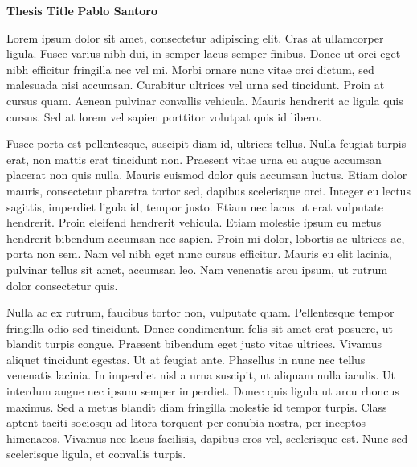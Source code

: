 \thispagestyle{plain}
\begin{center}
    \large
    \textbf{Thesis Title}
    \vspace{0.4cm}
    \textbf{Pablo Santoro}
    \vspace{Resumen}
\end{center}
Lorem ipsum dolor sit amet, consectetur adipiscing elit. Cras at ullamcorper ligula. Fusce varius nibh dui, in semper lacus semper finibus. Donec ut orci eget nibh efficitur fringilla nec vel mi. Morbi ornare nunc vitae orci dictum, sed malesuada nisi accumsan. Curabitur ultrices vel urna sed tincidunt. Proin at cursus quam. Aenean pulvinar convallis vehicula. Mauris hendrerit ac ligula quis cursus. Sed at lorem vel sapien porttitor volutpat quis id libero.

Fusce porta est pellentesque, suscipit diam id, ultrices tellus. Nulla feugiat turpis erat, non mattis erat tincidunt non. Praesent vitae urna eu augue accumsan placerat non quis nulla. Mauris euismod dolor quis accumsan luctus. Etiam dolor mauris, consectetur pharetra tortor sed, dapibus scelerisque orci. Integer eu lectus sagittis, imperdiet ligula id, tempor justo. Etiam nec lacus ut erat vulputate hendrerit. Proin eleifend hendrerit vehicula. Etiam molestie ipsum eu metus hendrerit bibendum accumsan nec sapien. Proin mi dolor, lobortis ac ultrices ac, porta non sem. Nam vel nibh eget nunc cursus efficitur. Mauris eu elit lacinia, pulvinar tellus sit amet, accumsan leo. Nam venenatis arcu ipsum, ut rutrum dolor consectetur quis.

Nulla ac ex rutrum, faucibus tortor non, vulputate quam. Pellentesque tempor fringilla odio sed tincidunt. Donec condimentum felis sit amet erat posuere, ut blandit turpis congue. Praesent bibendum eget justo vitae ultrices. Vivamus aliquet tincidunt egestas. Ut at feugiat ante. Phasellus in nunc nec tellus venenatis lacinia. In imperdiet nisl a urna suscipit, ut aliquam nulla iaculis. Ut interdum augue nec ipsum semper imperdiet. Donec quis ligula ut arcu rhoncus maximus. Sed a metus blandit diam fringilla molestie id tempor turpis. Class aptent taciti sociosqu ad litora torquent per conubia nostra, per inceptos himenaeos. Vivamus nec lacus facilisis, dapibus eros vel, scelerisque est. Nunc sed scelerisque ligula, et convallis turpis.

\newpage